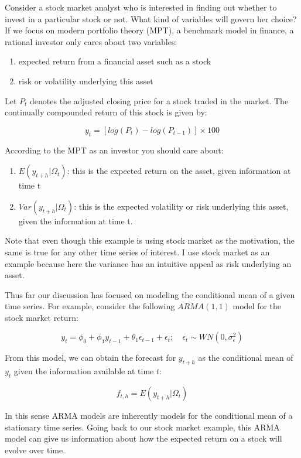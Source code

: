 \documentclass[]{book}
\providecommand{\tightlist}{%
  \setlength{\itemsep}{0pt}\setlength{\parskip}{0pt}}
\theoremstyle{definition}
\theoremstyle{definition}
\theoremstyle{definition}
\theoremstyle{remark}
\begin{document}
Consider a stock market analyst who is interested in finding out whether to invest in a particular stock or not. What kind of variables will govern her choice? If we focus on modern portfolio theory (MPT), a benchmark model in finance, a rational investor only cares about two variables:

\begin{enumerate}
\def\labelenumi{\arabic{enumi}.}
\tightlist
\item
  expected return from a financial asset such as a stock
\item
  risk or volatility underlying this asset
\end{enumerate}

Let \(P_t\) denotes the adjusted closing price for a stock traded in the market. The continually compounded return of this stock is given by:

\[y_t=[log(P_t)-log(P_{t-1})]\times 100\]

According to the MPT as an investor you should care about:

\begin{enumerate}
\def\labelenumi{\arabic{enumi}.}
\tightlist
\item
  \(E(y_{t+h}|\Omega_t)\): this is the expected return on the asset, given information at time t
\item
  \(Var(y_{t+h}|\Omega_t)\): this is the expected volatility or risk underlying this asset, given the information at time t.
\end{enumerate}

Note that even though this example is using stock market as the motivation, the same is true for any other time series of interest. I use stock market as an example because here the variance has an intuitive appeal as risk underlying an asset.

Thus far our discussion has focused on modeling the conditional mean of a given time series. For example, consider the following \(ARMA(1,1)\) model for the stock market return:

\[y_t=\phi_0 + \phi_1 y_{t-1} + \theta_1 \epsilon_{t-1} + \epsilon_t ; \quad \epsilon_t\sim WN(0, \sigma^2_\epsilon )\]

From this model, we can obtain the forecast for \(y_{t+h}\) as the conditional mean of \(y_t\) given the information available at time \(t\):

\[f_{t,h}=E(y_{t+h}|\Omega_t)\]

In this sense ARMA models are inherently models for the conditional mean of a stationary time series. Going back to our stock market example, this ARMA model can give us information about how the expected return on a stock will evolve over time.
\end{document}
